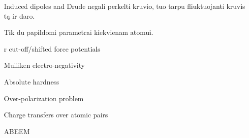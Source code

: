 
Induced dipoles and Drude negali perkelti kruvio, tuo tarpu fliuktuojanti kruvis tą ir daro.

Tik du papildomi parametrai kiekvienam atomui.

r cut-off/shifted force potentials

Mulliken electro-negativity

Absolute hardness

Over-polarization problem

Charge transfers over atomic pairs

ABEEM


